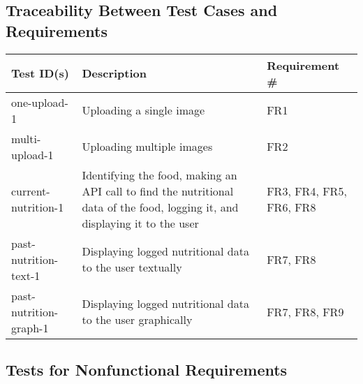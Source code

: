 \documentclass[12pt, titlepage]{article}
\begin{document}
	\subsection{Traceability Between Test Cases and Requirements}
	
	\begin{table}[!h]
	
	\begin{tabular}{|p{3.5cm}|p{6.5cm}|p{4.5cm}|}
	
	\hline
	\textbf{Test ID(s)}    & \textbf{Description}                                                                                                         & \textbf{Requirement \#} \\ \hline
	one-upload-1           & Uploading a single image                                                                                                     & FR1                     \\ \hline
	multi-upload-1         & Uploading multiple images                                                                                                    & FR2                     \\ \hline
	current-nutrition-1    & Identifying the food, making an API call to find the nutritional data of the food, logging it, and displaying it to the user & FR3, FR4, FR5, FR6, FR8 \\ \hline
	past-nutrition-text-1  & Displaying logged nutritional data to the user textually                                                                     & FR7, FR8                \\ \hline
	past-nutrition-graph-1 & Displaying logged nutritional data to the user graphically                                                                   & FR7, FR8, FR9           \\ \hline
	
	\end{tabular}
	
	\end{table}
	
	\subsection{Tests for Nonfunctional Requirements}
	
	
\end{document}

